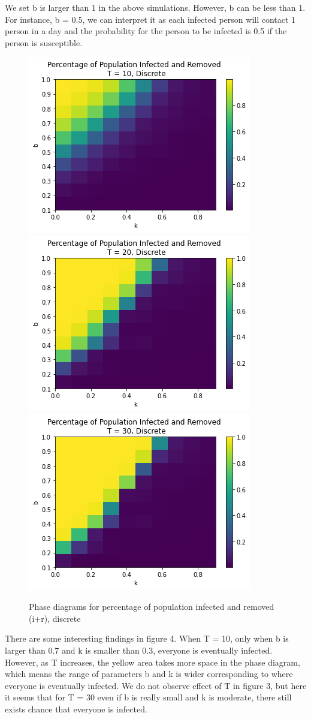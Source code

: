 \documentclass{article}
\begin{document}
We set b is larger than 1 in the above simulations. However, b can be less than 1. For instance, b = 0.5, we can interpret it as each infected person will contact 1 person in a day and the probability for the person to be infected is 0.5 if the person is susceptible.


\begin{figure}[htp]

\centering
\includegraphics[width=.3\textwidth]{Figure1_discrete_bsmall_T10.png}\hfill
\includegraphics[width=.3\textwidth]{Figure1_discrete_bsmall_T20.png}\hfill
\includegraphics[width=.3\textwidth]{Figure1_discrete_bsmall_T30.png}

\caption{Phase diagrams for percentage of population infected and removed (i+r), discrete}
\label{fig:figure3}

\end{figure}


There are some interesting findings in figure 4. When T = 10, only when b is larger than 0.7 and k is smaller than 0.3, everyone is eventually infected. However, as T increases, the yellow area takes more space in the phase diagram, which means the range of parameters b and k is wider corresponding to where everyone is eventually infected. We do not observe effect of T in figure 3, but here it seems that for T = 30 even if b is really small and k is moderate, there still exists chance that everyone is infected.
\end{document}
